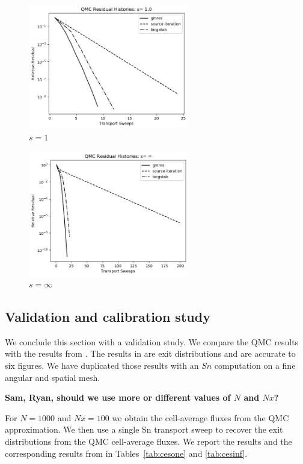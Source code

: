 \vspace*{.25in}

\begin{figure}[h]
  \centering
  \includegraphics[trim = 10mm 0mm 15mm 15mm, width=70mm]{FIGURES/seqone.png}
  \caption{$s = 1$}
  \label{fig:easy}
\end{figure}


\begin{figure}[h]
  \centering
  \includegraphics[trim = 10mm 0mm 15mm 15mm, width=70mm]{FIGURES/seqinf.png}
  \caption{$s = \infty$}
  \label{fig:hard}
\end{figure}

\clearpage

\subsection{Validation and calibration study}
\label{validation-and-calibration-study}

We conclude this section with a validation study. We compare the
QMC results with the results from \cite{cesinh}. The results
in \cite{cesinh} are exit distributions and are accurate to 
six figures. We have duplicated those results with an $Sn$ computation
on a fine angular and spatial mesh.

{\bf Sam, Ryan, should we use more or different values of $N$ and $Nx$?}

For $N = 1000$ and $Nx=100$ we obtain the cell-average fluxes from
the QMC approximation. We then use a single Sn transport sweep to recover
the exit distributions from the QMC cell-average fluxes. We report
the results and the corresponding results from \cite{cesinh} in 
Tables~\ref{tab:cesone} and \ref{tab:cesinf}.

